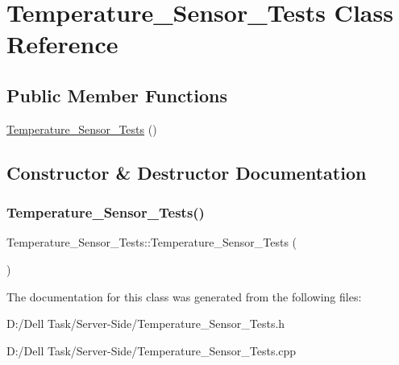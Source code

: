 \hypertarget{class_temperature___sensor___tests}{}\section{Temperature\+\_\+\+Sensor\+\_\+\+Tests Class Reference}
\label{class_temperature___sensor___tests}
\subsection*{Public Member Functions}
\begin{DoxyCompactItemize}
\item 
\mbox{\hyperlink{class_temperature___sensor___tests_a1c0463f3de5c7f3440efaa89a6efbb68}{Temperature\+\_\+\+Sensor\+\_\+\+Tests}} ()
\end{DoxyCompactItemize}


\subsection{Constructor \& Destructor Documentation}
\mbox{\label{class_temperature___sensor___tests_a1c0463f3de5c7f3440efaa89a6efbb68}} 
\subsubsection{\texorpdfstring{Temperature\+\_\+\+Sensor\+\_\+\+Tests()}{Temperature\_Sensor\_Tests()}}
{\footnotesize\ttfamily Temperature\+\_\+\+Sensor\+\_\+\+Tests\+::\+Temperature\+\_\+\+Sensor\+\_\+\+Tests (\begin{DoxyParamCaption}{ }\end{DoxyParamCaption})}







The documentation for this class was generated from the following files\+:\begin{DoxyCompactItemize}
\item 
D\+:/\+Dell Task/\+Server-\/\+Side/Temperature\+\_\+\+Sensor\+\_\+\+Tests.\+h\item 
D\+:/\+Dell Task/\+Server-\/\+Side/Temperature\+\_\+\+Sensor\+\_\+\+Tests.\+cpp\end{DoxyCompactItemize}
